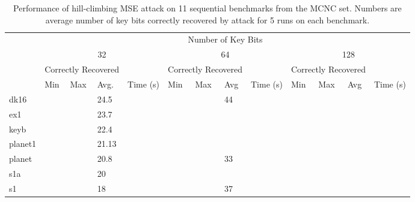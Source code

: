 \begin{table*}[ht]
\centering
\caption{Performance of hill-climbing MSE attack on 11 sequential benchmarks from the MCNC set. Numbers are average number of key bits correctly recovered by attack for 5 runs on each benchmark.}
\label{my-label}
\begin{tabular}{|l|l|l|l|l|l|l|l|l|l|l|l|l|}
\hline
\multirow{4}{*}{} & \multicolumn{12}{c|}{Number of Key Bits}                                                                                                                        \\ \cline{2-13} 
                  & \multicolumn{4}{c|}{32}                             & \multicolumn{4}{c|}{64}                             & \multicolumn{4}{c|}{128}                            \\ \cline{2-13} 
                  & \multicolumn{3}{l|}{Correctly Recovered} &          & \multicolumn{3}{l|}{Correctly Recovered} &          & \multicolumn{3}{l|}{Correctly Recovered} &          \\ \cline{2-13} 
                  & Min         & Max         & Avg.         & Time (s) & Min         & Max         & Avg          & Time (s) & Min         & Max         & Avg          & Time (s) \\ \hline
dk16              &           &           & 24.5         &          &           &           &         44 &          &           &           &          &          \\ \hline
ex1              &           &           & 23.7         &          &           &           &            &          &           &           &          &          \\ \hline
keyb             &           &           & 22.4         &          &           &           &          &          & 
&           &          &          \\ \hline
planet1             &           &           & 21.13         &          &           &           &          &         &           &           &          &          \\ \hline
planet             &           &           & 20.8         &          &           &           &      33    &         &           &           &          &          \\ \hline
s1a             &           &           & 20         &          &           &           &          &      &           &           &          &          \\ \hline
s1             &           &           & 18          &          &           &           &         37 &         &           &           &          &          \\ \hline

\end{tabular}
\end{table*}
